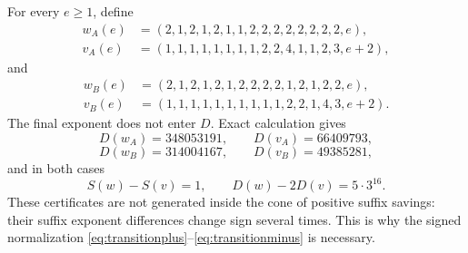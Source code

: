 \documentclass[11pt,reqno]{amsart}
\numberwithin{equation}{section}
\theoremstyle{definition}
\theoremstyle{remark}
\begin{document}
For every $e\ge1$, define
\[
\begin{aligned}
 w_A(e)&=(2,1,2,1,2,1,1,2,2,2,2,2,2,2,2,e),\\
 v_A(e)&=(1,1,1,1,1,1,1,1,2,2,4,1,1,2,3,e+2),
\end{aligned}
\]
and
\[
\begin{aligned}
 w_B(e)&=(2,1,2,1,2,1,2,2,2,2,1,2,1,2,2,e),\\
 v_B(e)&=(1,1,1,1,1,1,1,1,1,1,2,2,1,4,3,e+2).
\end{aligned}
\]
The final exponent does not enter $D$.  Exact calculation gives
\[
 D(w_A)=348053191,
 \qquad
 D(v_A)=66409793,
\]
\[
 D(w_B)=314004167,
 \qquad
 D(v_B)=49385281,
\]
and in both cases
\[
 S(w)-S(v)=1,
 \qquad
 D(w)-2D(v)=5\cdot3^{16}.
\]
These certificates are not generated inside the cone of positive suffix savings: their suffix exponent differences change sign several times.  This is why the signed normalization \eqref{eq:transitionplus}--\eqref{eq:transitionminus} is necessary.
\end{document}
